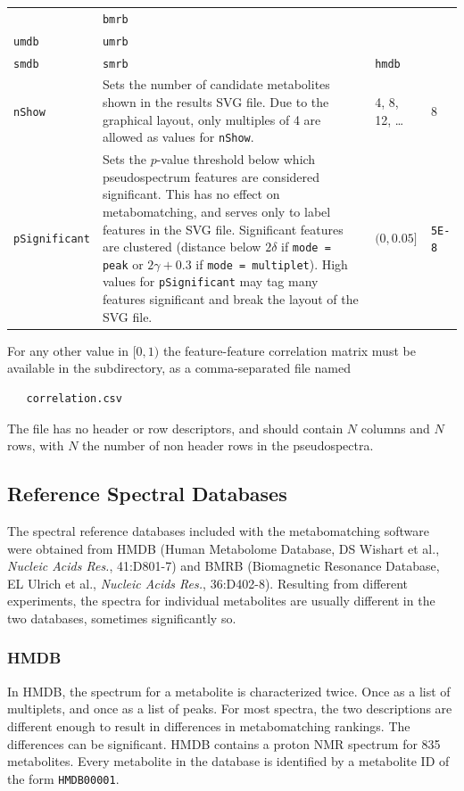 \documentclass[a4paper,11pt]{article}
\begin{document}
\begin{table}[h]
\begin{tabularx}{1.2\linewidth}{@{}lXll@{}}
\begin{tabular}[t]{@{}ll@{}}\texttt{hmdb}&\texttt{bmrb}\\\texttt{umdb}&\texttt{umrb}\\\texttt{smdb}&\texttt{smrb}\end{tabular} & %
\texttt{hmdb}\\
\texttt{nShow} & %
Sets the number of candidate metabolites shown in the results SVG file. Due to the graphical layout, only multiples of 4 are allowed as values for \texttt{nShow}. & %
4, 8, 12, \ldots &
8 \\
\texttt{pSignificant} & %
Sets the $p$-value threshold below which pseudospectrum features are considered significant. This has no effect on metabomatching, and serves only to label features in the SVG file. Significant features are clustered (distance below $2\delta$ if \texttt{mode = peak} or $2\gamma+0.3$ if \texttt{mode = multiplet}). High values for \texttt{pSignificant} may tag many features significant and break the layout of the SVG file. & %
$(0,0.05]$ & %
\texttt{5E-8} \\
\bottomrule
\end{tabularx}
\end{table}
For any other value in $[0,1)$ the feature-feature correlation matrix must be available in the subdirectory, as a comma-separated file named
\begin{verbatim}
   correlation.csv
\end{verbatim}
The file has no header or row descriptors, and should contain $N$ columns and $N$ rows, with $N$ the number of non header rows in the pseudospectra.
\subsection{Reference Spectral Databases\label{sec:databases}}
The spectral reference databases included with the metabomatching software were obtained from HMDB (Human Metabolome Database, DS Wishart et al., \emph{Nucleic Acids Res.}, 41:D801-7) and BMRB (Biomagnetic Resonance Database, EL Ulrich et al., \emph{Nucleic Acids Res.}, 36:D402-8). Resulting from different experiments, the spectra for individual metabolites are usually different in the two databases, sometimes significantly so.
\subsubsection{HMDB}
In HMDB, the spectrum for a metabolite is characterized twice. Once as a list of multiplets, and once as a list of peaks. For most spectra, the two descriptions are different enough to result in differences in metabomatching rankings. The differences can be significant. HMDB contains a proton NMR spectrum for 835 metabolites. Every metabolite in the database is identified by a metabolite ID of the form \verb|HMDB00001|.
\end{document}
